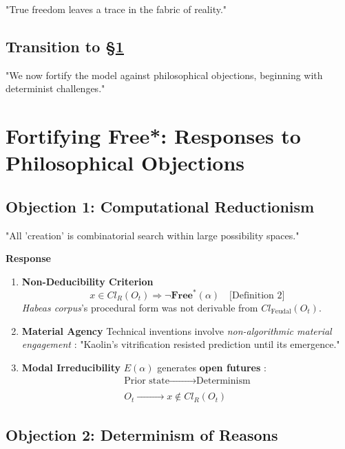 \documentclass[11pt,a4paper]{article}
\begin{document}
"True freedom leaves a trace in the fabric of reality." \cite[ p. 190]{arendt1958}

\subsection{Transition to \S\ref{sec:boundary}}

"We now fortify the model against philosophical objections, beginning with determinist challenges."

\section{Fortifying Free*: Responses to Philosophical Objections}\label{sec:boundary}

\subsection{Objection 1: Computational Reductionism}\label{sec:boundary-comp}

"All 'creation' is combinatorial search within large possibility spaces." \cite[ p. 219]{greene2021}

\textbf{Response}

\begin{enumerate}
  \item \textbf{Non-Deducibility Criterion} \[x\in Cl_{R}(O_{t})\Longrightarrow\neg\textbf{Free}^{*}(\alpha)\quad\text{[Definition 2]}\] \emph{Habeas corpus}'s procedural form was not derivable from \(Cl_{\text{Feudal}}(O_{t})\).
  \item \textbf{Material Agency} Technical inventions involve \emph{non-algorithmic material engagement} \cite{malafouris2023}: "Kaolin's vitrification resisted prediction until its emergence." \cite[ p. 211]{kerr2024}
  \item \textbf{Modal Irreducibility} \(E(\alpha)\) generates \textbf{open futures} \cite{torres2022}: \[\begin{array}{c}\text{Prior state}\xrightarrow{\qquad\qquad} \text{Determinism}\\ \\ O_{t}\xrightarrow{\qquad\qquad}x\notin Cl_{R}(O_{t})\end{array}\]
\end{enumerate}

\subsection{Objection 2: Determinism of Reasons}\label{sec:boundary-determinism}
\end{document}
